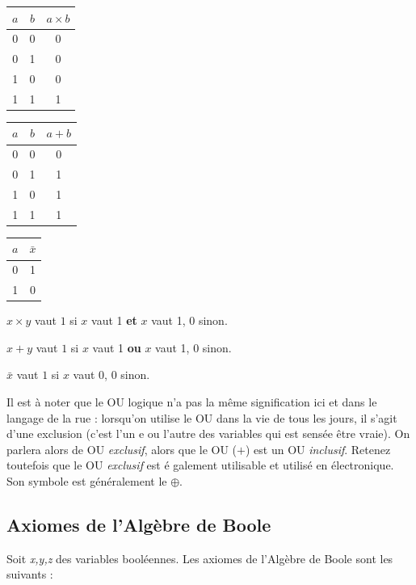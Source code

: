 \begin{center}
\begin{tabular}{|c c|c|}
  \hline
  $a$ & $b$  & $a \times b$ \\
  \hline
  0 & 0 & 0 \\
  0 & 1 & 0 \\
  1 & 0 & 0 \\
  1 & 1 & 1 \\
  \hline
\end{tabular}
\quad
\begin{tabular}{|c c|c|}
  \hline
  $a$ & $b$  & $a + b$ \\
  \hline
  0 & 0 & 0 \\
  0 & 1 & 1 \\
  1 & 0 & 1 \\
  1 & 1 & 1 \\
  \hline
\end{tabular}
\quad
\begin{tabular}{|c|c|}
  \hline
  $a$ & $\bar{x}$ \\
  \hline
  0 & 1 \\
  1 & 0 \\
  \hline
\end{tabular}
\end{center}

$x \times y$ vaut $1$ si $x$ vaut 1 {\bf et}  $x$ vaut 1, $0$ sinon.

$x + y$ vaut $1$ si $x$ vaut 1 {\bf ou}  $x$ vaut 1, $0$ sinon.

$\bar{x}$ vaut $1$ si $x$ vaut 0, $0$ sinon.

Il est à noter que le OU logique n'a pas la même signification ici et dans le langage de la rue : lorsqu'on utilise le OU dans la vie de tous les jours, il s'agit d'une exclusion (c'est l'un
e ou l'autre des variables qui est sensée être vraie). On parlera alors de OU {\it exclusif}, alors que le OU ($+$) est un OU {\it inclusif}. Retenez toutefois que le OU {\it exclusif} est é
galement utilisable et utilisé en électronique. Son symbole est généralement le $\oplus$.

\subsection{Axiomes de l'Algèbre de Boole}
Soit {\it x,y,z} des variables booléennes. Les axiomes de l'Algèbre de Boole sont les suivants :


